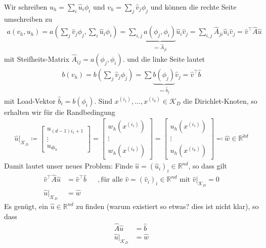 \documentclass{scrartcl}
\def\R{\mathbb{R}}
\newcommand{\cK}{\mathcal{K}}
\newcommand{\cS}{\mathcal{S}}
\newcommand{\hu}{\hat{u}}
\newcommand{\hv}{\hat{v}}
\newcommand{\hA}{\hat{A}}
\newcommand{\hw}{\hat{w}}
\newcommand{\hb}{\hat{b}}
\newcommand{\vect}[1]{\begin{bmatrix} #1 \end{bmatrix}}
\begin{document}
Wir schreiben $u_h=\sum_i\hu_i\phi_i$ und $v_h=\sum_j\hv_j\phi_j$ und können die rechte Seite umschreiben zu
\begin{align*}
	a(v_h,u_h)
	= a(\sum_{j}\hv_j\phi_j,\sum_{i}\hu_i\phi_i)
	= \sum_{i,j}\underbrace{a(\phi_j,\phi_i)}_{\eqqcolon \hA_{ji}}\hu_i\hv_j
	= \sum_{i,j}\hA_{ji}\hu_i\hv_j
	= \hv^\top \hA\hu
\end{align*}
mit Steifheits-Matrix $\hA_{ij} = a(\phi_j,\phi_i)$.
und die linke Seite lautet 
\begin{align*}
	b(v_h)
	= b(\sum_j \hv_j\phi_j)
	= \sum \underbrace{b(\phi_j)}_{\eqqcolon \hb_j}\hv_j
	= \hv^\top \hb
\end{align*}
mit Load-Vektor $\hb_i=b(\phi_i)$.
Sind $x^{(i_1)},\dots,x^{(i_k)}\in\cK_D$ die Dirichlet-Knoten, so erhalten wir für die Randbedingung
\begin{align*}
	 \hu\big\vert_{\cK_D}
	 \coloneqq \vect{u_{(d-1)i_1+1} \\ \vdots \\ u_{di_k}}
	 =\vect{w_h(x^{(i_1)}) \\ \vdots \\ w_h(x^{(i_k)})}
	 = \vect{u_h(x^{(i_1)}) \\ \vdots \\ u_h(x^{(i_k)})}
	 \eqqcolon \hw\in\R^{kd}
\end{align*}
Damit lautet unser neues Problem: Finde $\hu=(\hu_i)_i\in\R^{nd}$, so dass gilt
\begin{align*}
	\hv^\top\hA\hu&=\hv^\top\hb &&,\text{für alle }\hv=(\hv_i)_i\in\R^{nd}\text{ mit }\hv \big\vert_{\cK_D}=0 \\
	\hu\big\vert_{\cK_D} &= \hw
\end{align*}
Es genügt, ein $\hu\in\R^{nd}$ zu finden (warum existiert so etwas? dies ist nicht klar), so dass
\begin{align*}
	\hA\hu &= \hb \\
	\hu\big\vert_{\cK_D} &= \hw
\end{align*}
\end{document}
